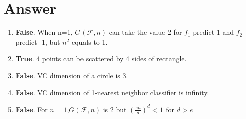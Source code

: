 \documentclass[
	12pt, %
]{fphw}
\begin{document}
\section*{Answer}
\begin{enumerate}
	\item \textbf{False}.  When n=1, $G(\mathcal{F},n)$ can take the value 2 for $f_1$ predict 1 and $f_2$ predict -1, but $n^2$ equals to 1.
	\item \textbf{True}. 4 points can be scattered by 4 sides of rectangle.
	\item \textbf{False}. VC dimension of a circle is 3.
	\item \textbf{False}. VC dimension of 1-nearest neighbor classifier is infinity.
	\item \textbf{False}. For $n=1$,$G(\mathcal{F},n)$ is 2 but $\left(\frac{en}d\right)^d<1$ for $d>e$
\end{enumerate}







\end{document}
